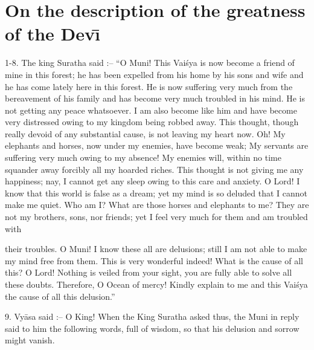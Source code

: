 \chapter{On the description of the greatness of the Dev\={\i}}

1-8. The king Suratha said :-- ``O Muni! This Vai\'sya is now become a friend of mine in this forest; he has been expelled from his home by his sons and wife and he has come lately here in this forest. He is now suffering very much from the bereavement of his family and has become very much troubled in his mind. He is not getting any peace whatsoever. I am also become like him and have become very distressed owing to my kingdom being robbed away. This thought, though really devoid of any substantial cause, is not leaving my heart now. Oh! My elephants and horses, now under my enemies, have become weak; My servants are suffering very much owing to my absence! My enemies will, within no time squander away forcibly all my hoarded riches. This thought is not giving me any happiness; nay, I cannot get any sleep owing to this care and anxiety. O Lord! I know that this world is false as a dream; yet my mind is so deluded that I cannot make me quiet. Who am I? What are those horses and elephants to me? They are not my brothers, sons, nor friends; yet I feel very much for them and am troubled with

their troubles. O Muni! I know these all are delusions; still I am not able to make my mind free from them. This is very wonderful indeed! What is the cause of all this? O Lord! Nothing is veiled from your sight, you are fully able to solve all these doubts. Therefore, O Ocean of mercy! Kindly explain to me and this Vai\'sya the cause of all this delusion.''

9. Vy\=asa said :-- O King! When the King Suratha asked thus, the Muni in reply said to him the following words, full of wisdom, so that his delusion and sorrow might vanish.

